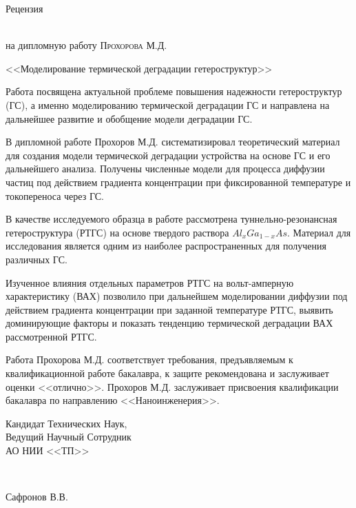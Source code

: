 \documentclass[utf8, 14pt]{G7-32}
\begin{document}
\frontmatter
\begin{center}
	\begin{LARGE}
		Рецензия
	\end{LARGE}\\
	 на дипломную работу \textsc{Прохорова М.Д.}\\
	 \begin{large}
	 <<Моделирование термической деградации гетероструктур>>
	 \end{large}
\end{center}

Работа посвящена актуальной проблеме повышения надежности гетероструктур (ГС), а именно моделированию термической деградации ГС и направлена на дальнейшее развитие и обобщение модели деградации ГС.


В дипломной работе Прохоров М.Д. систематизировал теоретический материал для создания модели термической деградации устройства на основе ГС и его дальнейшего анализа. Получены численные модели для процесса диффузии частиц под действием градиента концентрации при фиксированной температуре и токопереноса через ГС.

В качестве исследуемого образца в работе рассмотрена туннельно-резонансная гетероструктура (РТГС) на основе твердого раствора $Al_{x}Ga_{1-x}As$. Материал для исследования является одним из наиболее распространенных для получения различных ГС. 

Изученное влияния отдельных параметров РТГС на вольт-амперную характеристику (ВАХ) позволило при дальнейшем моделировании диффузии под действием градиента концентрации при заданной температуре РТГС, выявить доминирующие факторы и показать тенденцию термической деградации ВАХ рассмотренной РТГС.

Работа Прохорова М.Д. соответствует требования, предъявляемым к квалификационной работе бакалавра, к защите рекомендована и заслуживает оценки <<отлично>>. Прохоров М.Д. заслуживает присвоения квалификации бакалавра по направлению <<Наноинженерия>>.\\[2.5cm]
\noindent
\begin{minipage}{0.5\textwidth}
    \begin{flushleft} \large
    	Кандидат Технических Наук,\\
    	Ведущий Научный Сотрудник\\
    	АО НИИ <<ТП>>
    \end{flushleft}
\end{minipage}
~
\begin{minipage}{0.5\textwidth}
    \begin{flushright} \large
    	Сафронов В.В.
    \end{flushright}
\end{minipage}
\end{document}

